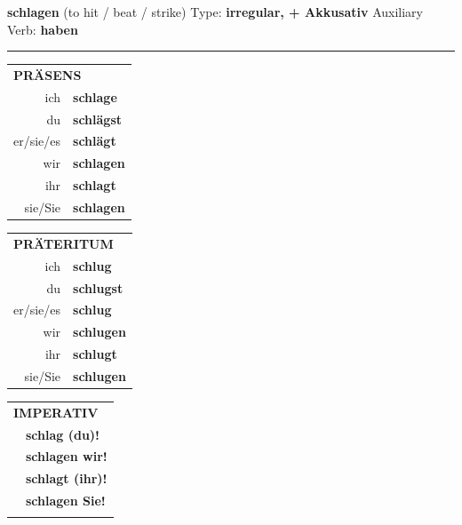 \documentclass[10pt,a4paper]{revtex4-2}
\begin{document}
\begin{verbbox-acc} 
    {\Large \bf schlagen} (to hit / beat / strike) \hfill Type: \textbf{irregular, + Akkusativ} \hfill Auxiliary Verb: \textbf{haben} 
    
     \vspace{5pt}

    \hrule
    
    \vspace{5pt}

  \begin{tabular}{rl}
     \multicolumn{2}{l}{\textbf{PRÄSENS} }\\
    ich & \textbf{schlage}\\
    du & \textbf{schlägst}\\
    er/sie/es & \textbf{schlägt}\\
    wir & \textbf{schlagen}\\
    ihr & \textbf{schlagt}\\
    sie/Sie & \textbf{schlagen}\\
  \end{tabular}
  \hfill
  \begin{tabular}{rl}
    \multicolumn{2}{l}{\textbf{PRÄTERITUM} }\\
    ich & \textbf{schlug}\\
    du & \textbf{schlugst}\\
    er/sie/es & \textbf{schlug}\\
    wir & \textbf{schlugen}\\
    ihr & \textbf{schlugt}\\
    sie/Sie & \textbf{schlugen}\\
  \end{tabular}
  \hfill
  \begin{tabular}{rl}
     \multicolumn{2}{l}{\textbf{IMPERATIV} }\\
   & \textbf{schlag (du)!}\\
   & \textbf{schlagen wir!}\\
   & \textbf{schlagt (ihr)!}\\
   & \textbf{schlagen Sie!}\\
   & \vspace{10pt}
  \end{tabular}

 \vspace{10pt}


\end{verbbox-acc}
\end{document}
